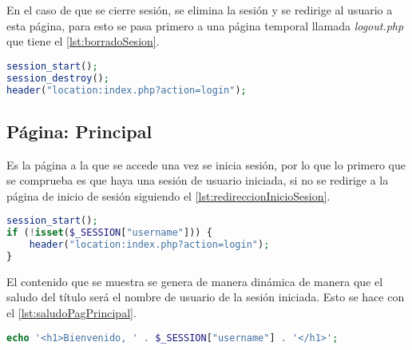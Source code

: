 En el caso de que se cierre sesión, se elimina la sesión y se redirige al usuario a esta página, para esto se pasa primero a una página temporal llamada \textit{logout.php} que tiene el \autoref{lst:borradoSesion}.
\begin{lstlisting}[language=PHP, caption=Borrado de sesión y redirección a la página de inicio, label=lst:borradoSesion]
session_start();
session_destroy();
header("location:index.php?action=login");
\end{lstlisting}

\subsection{Página: Principal}\label{subsec:implPagPrincipal}
Es la página a la que se accede una vez se inicia sesión, por lo que lo primero que se comprueba es que haya una sesión de usuario iniciada, si no se redirige a la página de inicio de sesión siguiendo el \autoref{lst:redireccionInicioSesion}.
\begin{lstlisting}[language=PHP, caption=Redirección a la página de inicio de sesión si sesión no iniciada, label=lst:redireccionInicioSesion]
session_start();
if (!isset($_SESSION["username"])) {
    header("location:index.php?action=login");
}
\end{lstlisting}

El contenido que se muestra se genera de manera dinámica de manera que el saludo del título será el nombre de usuario de la sesión iniciada. Esto se hace con el \autoref{lst:saludoPagPrincipal}.
\pagebreak

\begin{lstlisting}[language=PHP, caption=Saludo página principal, label=lst:saludoPagPrincipal]
echo '<h1>Bienvenido, ' . $_SESSION["username"] . '</h1>';
\end{lstlisting}


